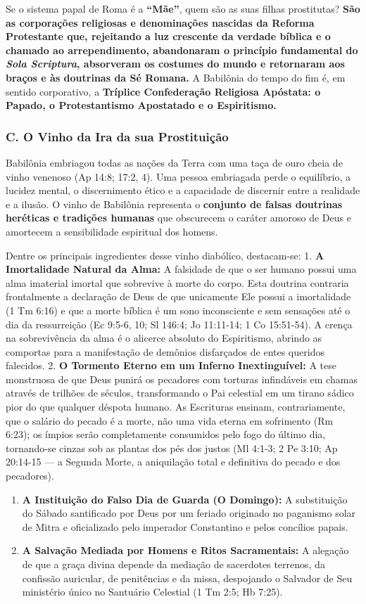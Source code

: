 \documentclass[11pt,a4paper,openany]{book}
\begin{document}
Se o sistema papal de Roma é a \textbf{``Mãe''}, quem são as suas filhas prostitutas? \textbf{São as corporações religiosas e denominações nascidas da Reforma Protestante que, rejeitando a luz crescente da verdade bíblica e o chamado ao arrependimento, abandonaram o princípio fundamental do \textit{Sola Scriptura}, absorveram os costumes do mundo e retornaram aos braços e às doutrinas da Sé Romana.} A Babilônia do tempo do fim é, em sentido corporativo, a \textbf{Tríplice Confederação Religiosa Apóstata: o Papado, o Protestantismo Apostatado e o Espiritismo.}


\subsubsection*{C. O Vinho da Ira da sua Prostituição}

Babilônia embriagou todas as nações da Terra com uma taça de ouro cheia de vinho venenoso (Ap 14:8; 17:2, 4). Uma pessoa embriagada perde o equilíbrio, a lucidez mental, o discernimento ético e a capacidade de discernir entre a realidade e a ilusão. O vinho de Babilônia representa o \textbf{conjunto de falsas doutrinas heréticas e tradições humanas} que obscurecem o caráter amoroso de Deus e amortecem a sensibilidade espiritual dos homens.

Dentre os principais ingredientes desse vinho diabólico, destacam-se:
1. \textbf{A Imortalidade Natural da Alma:} A falsidade de que o ser humano possui uma alma imaterial imortal que sobrevive à morte do corpo. Esta doutrina contraria frontalmente a declaração de Deus de que unicamente Ele possui a imortalidade (1 Tm 6:16) e que a morte bíblica é um sono inconsciente e sem sensações até o dia da ressurreição (Ec 9:5-6, 10; Sl 146:4; Jo 11:11-14; 1 Co 15:51-54). A crença na sobrevivência da alma é o alicerce absoluto do Espiritismo, abrindo as comportas para a manifestação de demônios disfarçados de entes queridos falecidos.
2. \textbf{O Tormento Eterno em um Inferno Inextinguível:} A tese monstruosa de que Deus punirá os pecadores com torturas infindáveis em chamas através de trilhões de séculos, transformando o Pai celestial em um tirano sádico pior do que qualquer déspota humano. As Escrituras ensinam, contrariamente, que o salário do pecado é a morte, não uma vida eterna em sofrimento (Rm 6:23); os ímpios serão completamente consumidos pelo fogo do último dia, tornando-se cinzas sob as plantas dos pés dos justos (Ml 4:1-3; 2 Pe 3:10; Ap 20:14-15 — a Segunda Morte, a aniquilação total e definitiva do pecado e dos pecadores).
\begin{enumerate}
  \item \textbf{A Instituição do Falso Dia de Guarda (O Domingo):} A substituição do Sábado santificado por Deus por um feriado originado no paganismo solar de Mitra e oficializado pelo imperador Constantino e pelos concílios papais.
  \item \textbf{A Salvação Mediada por Homens e Ritos Sacramentais:} A alegação de que a graça divina depende da mediação de sacerdotes terrenos, da confissão auricular, de penitências e da missa, despojando o Salvador de Seu ministério único no Santuário Celestial (1 Tm 2:5; Hb 7:25).
\end{enumerate}
\end{document}
